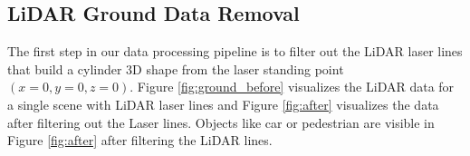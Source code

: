 %
%
%


\subsection{LiDAR Ground Data Removal}
The first step in our data processing pipeline is to filter out the LiDAR laser lines that build
a cylinder 3D shape from the laser standing point $(x=0, y=0, z=0)$. Figure \ref{fig:ground_before} visualizes the LiDAR data for a single scene with LiDAR laser lines and Figure \ref{fig:after} visualizes the data after
filtering out the Laser lines. Objects like car or pedestrian are
visible in Figure \ref{fig:after} after filtering the LiDAR lines.

